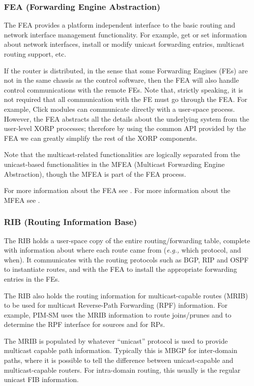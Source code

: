 \documentclass[11pt]{article}
\newcommand{\eg}{\emph{e.g.,}\xspace}
\begin{document}
\subsubsection{FEA (Forwarding Engine Abstraction)}

The FEA provides a platform independent interface to the basic routing
and network interface management functionality.
For example, get or set information about network interfaces, install or
modify unicast forwarding entries, multicast routing support, etc.

If the router is distributed, in the sense that some
Forwarding Engines (FEs) are not in the same chassis as the control
software, then the FEA will also handle control communications with the
remote FEs.  Note that, strictly speaking, it is not required that all
communication with the FE must go through the FEA. For example, Click
modules can communicate directly with a user-space process. However,
the FEA abstracts all the details about the underlying system
from the user-level XORP processes; therefore by using the common API
provided by the FEA we can greatly simplify the rest of the XORP
components.

Note that the multicast-related functionalities are logically separated from
the unicast-based functionalities in the MFEA (Multicast Forwarding Engine
Abstraction), though the MFEA is part of the FEA process.

For more information about the FEA see \cite{xorp:fea}.
For more information about the MFEA see \cite{xorp:mfea}.

\subsubsection{RIB (Routing Information Base)}

The RIB holds a user-space copy of the entire routing/forwarding table,
complete with information about where each route came from (\eg which
protocol, and when). It communicates with the routing protocols such as
BGP, RIP and OSPF to instantiate routes, and with the FEA to install the
appropriate forwarding entries in the FEs.

The RIB also holds the routing information for multicast-capable routes
(MRIB) to be used for multicast Reverse-Path Forwarding (RPF) information.
For example, PIM-SM uses the MRIB information to route joins/prunes and
to determine the RPF interface for sources and for RPs.

The MRIB is populated by whatever ``unicast'' protocol is used to
provide multicast capable path information. Typically this is
MBGP for inter-domain paths, where it is possible to tell the
difference between unicast-capable and multicast-capable routers.  For
intra-domain routing, this usually is the regular unicast FIB
information.
\end{document}
